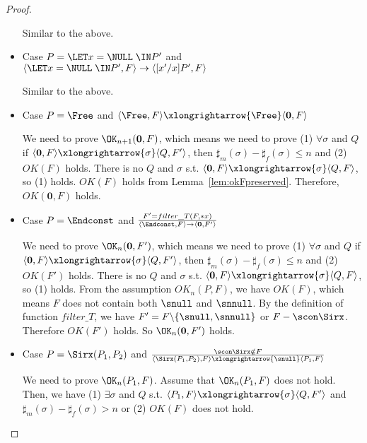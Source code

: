 \begin{proof}
\begin{itemize}
    Similar to the above.
  
\item Case \(P = \LET x = \NULL \; \IN P'\) and \( \langle \LET x = \NULL \;
  \IN P', F \rangle \rightarrow \langle [x'/x]P', F \rangle\)
  
    Similar to the above.
  
\item Case \(P = \Free\) and \(\langle \Free, F \rangle
  \xlongrightarrow{\Free} \langle \mathbf{0}, F \rangle \)

  We need to prove \(\OK_{n+1}(\mathbf{0}, F)\), which means we need to
  prove (1) \( \forall \sigma \) and \(Q\) if \( \langle \mathbf{0}, F
  \rangle \xlongrightarrow{\sigma} \langle Q, F' \rangle \), then
  \(\sharp_{m}(\sigma) - \sharp_{f}(\sigma) \le n\) and (2) \( OK(F)\)
  holds.  There is no \(Q\) and \(\sigma\) s.t. \(\langle \mathbf{0}, F
  \rangle \xlongrightarrow{\sigma} \langle Q, F \rangle \), so (1)
  holds.  \(OK(F)\) holds from
  Lemma~\ref{lem:okFpreserved}. Therefore, \(OK(\mathbf{0}, F)\) holds.

\item Case \(P = \Endconst\) and \(\frac {F' = filter\_T(F, *x) }
  {\langle \Endconst, F \rangle \rightarrow \langle \mathbf{0}, F' \rangle} \)

  We need to prove \(\OK_n(\mathbf{0}, F')\), which means we need to
  prove (1) \( \forall \sigma \) and \(Q\) if \( \langle \mathbf{0}, F
  \rangle \xlongrightarrow{\sigma} \langle Q, F' \rangle \), then
  \(\sharp_{m}(\sigma) - \sharp_{f}(\sigma) \le n\) and (2) \(
  OK(F')\) holds.  There is no \(Q\) and \(\sigma\) s.t. \(\langle
  \mathbf{0}, F \rangle \xlongrightarrow{\sigma} \langle Q, F \rangle \),
  so (1) holds.  From the assumption \(OK_n(P, F)\), we have
  \(OK(F)\), which means \(F\) does not contain both \(\snull\) and
  \(\snnull\). By the definition of function \(filter\_T\), we have
  \(F' = F\backslash\{\snull, \snnull\}\) or \(F - \scon\Sirx
  \). Therefore \(OK(F')\) holds. So \(\OK_n(\mathbf{0}, F')\) holds.
  
    
\item Case \( P = \Sirx(P_1,P_2) \) and \( \frac{ \scon\Sirx \notin F}
  { \langle \Sirx(P_1, P_2), F \rangle \xlongrightarrow{\snull} \langle P_1, F
    \rangle } \)

  We need to prove \(\OK_n(P_1, F)\).  Assume that \(\OK_n(P_1, F)\)
  does not hold. Then, we have (1) \( \exists \sigma \) and \(Q\)
  s.t. \( \langle P_1, F \rangle \xlongrightarrow{\sigma} \langle Q,
  F' \rangle \) and \(\sharp_{m}(\sigma) -
  \sharp_{f}(\sigma) > n\) or (2) \( OK(F)\) does not hold.


\end{itemize}
\end{proof}
